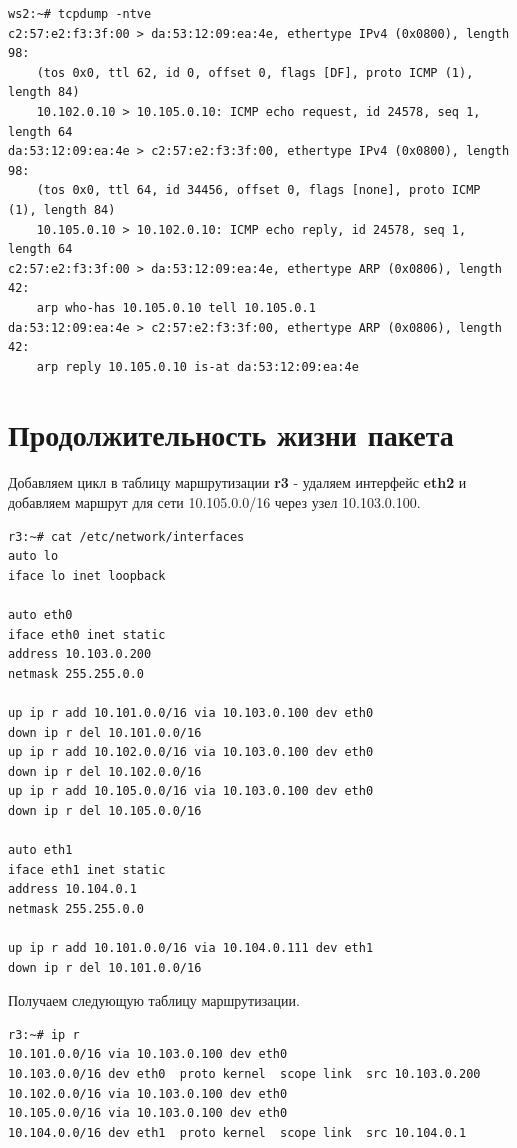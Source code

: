 \documentclass[a4paper,12pt]{article}
\begin{document}
\begin{Verbatim}
ws2:~# tcpdump -ntve
c2:57:e2:f3:3f:00 > da:53:12:09:ea:4e, ethertype IPv4 (0x0800), length 98:
    (tos 0x0, ttl 62, id 0, offset 0, flags [DF], proto ICMP (1), length 84)
    10.102.0.10 > 10.105.0.10: ICMP echo request, id 24578, seq 1, length 64
da:53:12:09:ea:4e > c2:57:e2:f3:3f:00, ethertype IPv4 (0x0800), length 98:
    (tos 0x0, ttl 64, id 34456, offset 0, flags [none], proto ICMP (1), length 84)
    10.105.0.10 > 10.102.0.10: ICMP echo reply, id 24578, seq 1, length 64
c2:57:e2:f3:3f:00 > da:53:12:09:ea:4e, ethertype ARP (0x0806), length 42:
    arp who-has 10.105.0.10 tell 10.105.0.1
da:53:12:09:ea:4e > c2:57:e2:f3:3f:00, ethertype ARP (0x0806), length 42:
    arp reply 10.105.0.10 is-at da:53:12:09:ea:4e
\end{Verbatim}


\section{Продолжительность жизни пакета}

Добавляем цикл в таблицу маршрутизации \textbf{r3} - удаляем интерфейс \textbf{eth2} и добавляем маршрут для сети 10.105.0.0/16 через узел 10.103.0.100.

\begin{Verbatim}
r3:~# cat /etc/network/interfaces 
auto lo
iface lo inet loopback

auto eth0
iface eth0 inet static
address 10.103.0.200
netmask 255.255.0.0

up ip r add 10.101.0.0/16 via 10.103.0.100 dev eth0
down ip r del 10.101.0.0/16
up ip r add 10.102.0.0/16 via 10.103.0.100 dev eth0
down ip r del 10.102.0.0/16
up ip r add 10.105.0.0/16 via 10.103.0.100 dev eth0
down ip r del 10.105.0.0/16

auto eth1
iface eth1 inet static
address 10.104.0.1
netmask 255.255.0.0

up ip r add 10.101.0.0/16 via 10.104.0.111 dev eth1
down ip r del 10.101.0.0/16
\end{Verbatim}

Получаем следующую таблицу маршрутизации.

\begin{Verbatim}
r3:~# ip r
10.101.0.0/16 via 10.103.0.100 dev eth0 
10.103.0.0/16 dev eth0  proto kernel  scope link  src 10.103.0.200 
10.102.0.0/16 via 10.103.0.100 dev eth0 
10.105.0.0/16 via 10.103.0.100 dev eth0 
10.104.0.0/16 dev eth1  proto kernel  scope link  src 10.104.0.1
\end{Verbatim}
\end{document}
